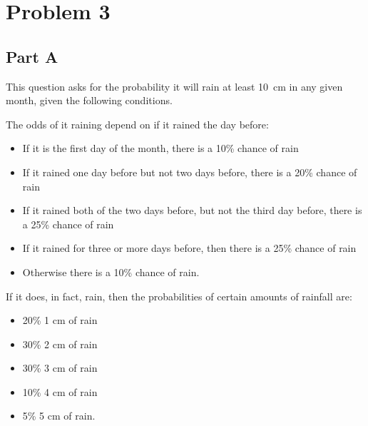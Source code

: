 \documentclass[twocolumn]{revtex4}
\begin{document}
\section{Problem 3}

\subsection{Part A}

	This question asks for the probability it will rain at least 10~cm in any given month, 
	given the following conditions.
	
	The odds of it raining depend on if it rained the day before:
	\begin{itemize}
		\item If it is the first day of the month, there is a 10\% chance of rain
		\item If it rained one day before but not two days before, there is a 20\% 
		chance of rain
		\item If it rained both of the two days before, but not the third day before, there is a 
		25\% chance of rain 
		\item If it rained for three or more days before, then there is a 25\% chance of rain
		\item Otherwise there is a 10\% chance of rain. 
	\end{itemize}
	If it does, in fact, rain, then the probabilities of certain amounts of rainfall are:
	\begin{itemize}
		\item 20\% 1 cm of rain
		\item 30\% 2 cm of rain
		\item 30\% 3 cm of rain
		\item 10\% 4 cm of rain
		\item 5\% 5 cm of rain.
	\end{itemize}
	
\end{document}
